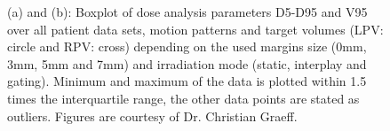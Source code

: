 \documentclass[type=dr, dr=rernat, accentcolor=tud7b,colorbacktitle, bigchapter, openright, twoside, 12pt ]{tudthesis}
\begin{document}
\newpage 

\begin{figure}[H]
\centering
{}
\caption{(a) and (b): Boxplot of dose analysis parameters D5-D95 and V95 over all patient data sets, motion patterns and target volumes (LPV: circle and 
RPV: cross) depending on the used margins size (0mm, 3mm, 5mm and 7mm) and irradiation mode (static, interplay and gating). Minimum and 
maximum of the data is plotted within 1.5 times the interquartile range, the other data points are stated as outliers. 
Figures are courtesy of Dr. Christian Graeff.}
\label{static_interplay_gating_ALLpatients_KORR}
\end{figure}
\end{document}
